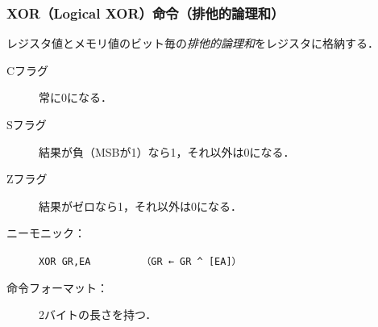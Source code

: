 \documentclass[handout]{beamer}        %
\begin{document}
\begin{frame}
  \frametitle{XOR（Logical XOR）命令（排他的論理和）}
  レジスタ値とメモリ値のビット毎の\emph{排他的論理和}をレジスタに格納する．
  \vfill
  \begin{description}
  \item[Cフラグ] 常に0になる．
  \item[Sフラグ] 結果が負（MSBが1）なら1，それ以外は0になる．
  \item[Zフラグ] 結果がゼロなら1，それ以外は0になる．
    \vfill
  \item[ニーモニック：]\texttt{XOR GR,EA}~~~~~~~~~\texttt{（GR ← GR \textasciicircum{} [EA]）}
    \vfill
  \item[命令フォーマット：] 2バイトの長さを持つ．\\
    {\small{}}
    \vfill
  \end{description}
  \vfill
\end{frame}
\end{document}
